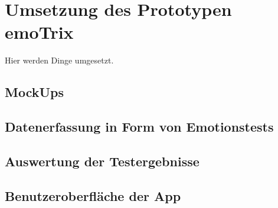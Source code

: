 \section{Umsetzung des Prototypen emoTrix}
Hier werden Dinge umgesetzt.
\subsection{MockUps}
\subsection{Datenerfassung in Form von Emotionstests}
\subsection{Auswertung der Testergebnisse}
\subsection{Benutzeroberfläche der App}
